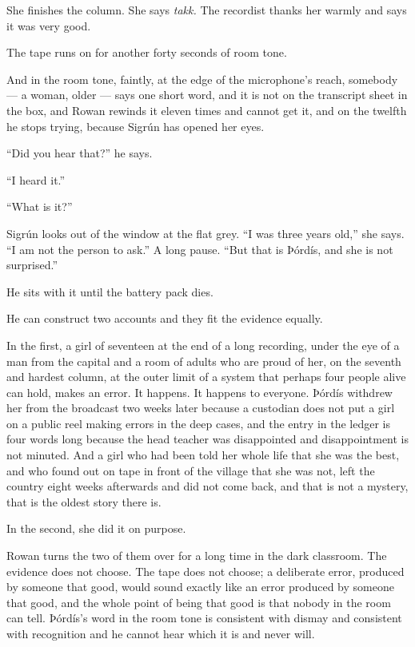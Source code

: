 \documentclass[11pt,oneside]{book}
\newcommand{\sceneline}{%
  \par\vspace{1.2em}
  \begin{center}
    \fontsize{11}{11}\selectfont \textbullet\quad\textbullet\quad\textbullet
  \end{center}
  \vspace{0.6em}\noindent\ignorespaces
}
\begin{document}
She finishes the column. She says \emph{takk.} The recordist thanks her
warmly and says it was very good.

The tape runs on for another forty seconds of room tone.

And in the room tone, faintly, at the edge of the microphone's reach,
somebody --- a woman, older --- says one short word, and it is not on
the transcript sheet in the box, and Rowan rewinds it eleven times and
cannot get it, and on the twelfth he stops trying, because Sigrún has
opened her eyes.

``Did you hear that?'' he says.

``I heard it.''

``What is it?''

Sigrún looks out of the window at the flat grey. ``I was three years
old,'' she says. ``I am not the person to ask.'' A long pause. ``But
that is Þórdís, and she is not surprised.''

\sceneline

He sits with it until the battery pack dies.

He can construct two accounts and they fit the evidence equally.

In the first, a girl of seventeen at the end of a long recording, under
the eye of a man from the capital and a room of adults who are proud of
her, on the seventh and hardest column, at the outer limit of a system
that perhaps four people alive can hold, makes an error. It happens. It
happens to everyone. Þórdís withdrew her from the broadcast two weeks
later because a custodian does not put a girl on a public reel making
errors in the deep cases, and the entry in the ledger is four words long
because the head teacher was disappointed and disappointment is not
minuted. And a girl who had been told her whole life that she was the
best, and who found out on tape in front of the village that she was
not, left the country eight weeks afterwards and did not come back, and
that is not a mystery, that is the oldest story there is.

In the second, she did it on purpose.

Rowan turns the two of them over for a long time in the dark classroom.
The evidence does not choose. The tape does not choose; a deliberate
error, produced by someone that good, would sound exactly like an error
produced by someone that good, and the whole point of being that good is
that nobody in the room can tell. Þórdís's word in the room tone is
consistent with dismay and consistent with recognition and he cannot
hear which it is and never will.
\end{document}
